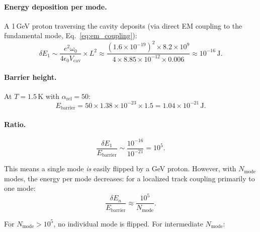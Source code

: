 \documentclass[11pt,twocolumn]{article}
\theoremstyle{definition}
\theoremstyle{remark}
\begin{document}
\paragraph{Energy deposition per mode.}
A 1\,GeV proton traversing the cavity deposits (via direct EM coupling
to the fundamental mode, Eq.~\eqref{eq:em_coupling}):
\begin{equation}
\delta E_1 \sim \frac{e^2 \omega_0}{4\epsilon_0 V_{\mathrm{cav}}}
\times L^2 \approx \frac{(1.6\times 10^{-19})^2 \times 8.2\times 10^9}
{4 \times 8.85\times 10^{-12} \times 0.006}
\approx 10^{-16}\,\mathrm{J}.
\end{equation}

\paragraph{Barrier height.}
At $T = 1.5\,\mathrm{K}$ with $\alpha_{\mathrm{rel}} = 50$:
\begin{equation}
E_{\mathrm{barrier}} = 50 \times 1.38\times 10^{-23} \times 1.5
= 1.04\times 10^{-21}\,\mathrm{J}.
\end{equation}

\paragraph{Ratio.}
\begin{equation}
\frac{\delta E_1}{E_{\mathrm{barrier}}} \sim \frac{10^{-16}}{10^{-21}} = 10^5.
\end{equation}

This means a single mode \emph{is} easily flipped by a GeV proton.
However, with $N_{\mathrm{mode}}$ modes, the energy per mode decreases:
for a localized track coupling primarily to one mode:
\begin{equation}
\frac{\delta E_n}{E_{\mathrm{barrier}}} \approx \frac{10^5}{N_{\mathrm{mode}}}.
\end{equation}

For $N_{\mathrm{mode}} > 10^5$, no individual mode is flipped. For
intermediate $N_{\mathrm{mode}}$:
\end{document}

